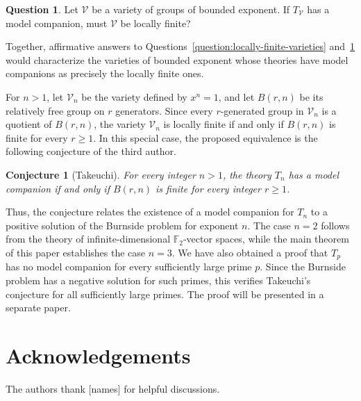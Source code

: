 \documentclass[11pt,reqno]{article}
\newtheorem*{conjecture*}{Conjecture}
\theoremstyle{definition}
\newtheorem{question}[theorem]{Question}
\theoremstyle{remark}
\begin{document}
\begin{question}\label{question:bounded-exponent-varieties}
Let $\mathcal V$ be a variety of groups of bounded exponent.
If $T_{\mathcal V}$ has a model companion, must $\mathcal V$ be
locally finite?
\end{question}

Together, affirmative answers to
Questions~\ref{question:locally-finite-varieties}
and~\ref{question:bounded-exponent-varieties} would characterize
the varieties of bounded exponent whose theories have model
companions as precisely the locally finite ones.

For $n>1$, let $\mathcal V_n$ be the variety defined by $x^n=1$,
and let $B(r,n)$ be its relatively free group on $r$ generators.
Since every $r$-generated group in $\mathcal V_n$ is a quotient
of $B(r,n)$, the variety $\mathcal V_n$ is locally finite if and
only if $B(r,n)$ is finite for every $r\geq1$.
In this special case, the proposed equivalence is the following
conjecture of the third author.

\begin{conjecture*}[Takeuchi]
For every integer $n>1$, the theory $T_n$ has a model companion
if and only if $B(r,n)$ is finite for every integer $r\geq1$.
\end{conjecture*}

Thus, the conjecture relates the existence of a model companion
for $T_n$ to a positive solution of the Burnside problem for
exponent $n$. The case $n=2$ follows from the theory of
infinite-dimensional $\mathbb F_2$-vector spaces, while the main
theorem of this paper establishes the case $n=3$.
We have also obtained a proof that $T_p$ has no model companion for
every sufficiently large prime $p$. Since the Burnside problem has a
negative solution for such primes, this verifies Takeuchi's conjecture
for all sufficiently large primes. The proof will be presented in a
separate paper.

\section*{Acknowledgements}

The authors thank [names] for helpful discussions.

% 
% 
\end{document}
